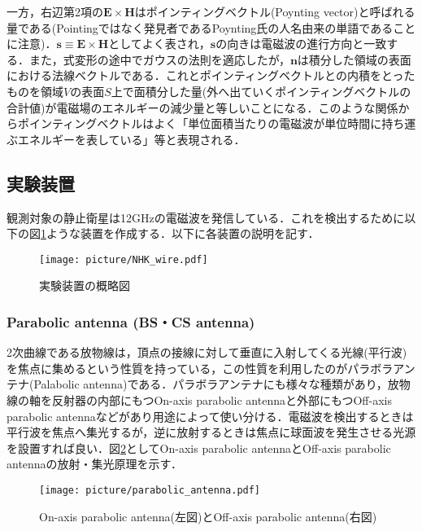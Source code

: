 \documentclass[a4j,10pt,oneside,openany]{jsbook}
\newcommand{\vE}{\boldsymbol{E}}
\newcommand{\vH}{\boldsymbol{H}}
\newcommand{\vn}{\boldsymbol{n}}
\newcommand{\vs}{\boldsymbol{s}}
\begin{document}
{一方，右辺第2項の$\vE\times\vH$はポインティングベクトル(Poynting vector)と呼ばれる量である(Pointingではなく発見者であるPoynting氏の人名由来の単語であることに注意)．$\vs\equiv\vE\times\vH$としてよく表され，$\vs$の向きは電磁波の進行方向と一致する．また，式変形の途中でガウスの法則を適応したが，$\vn$は積分した領域の表面における法線ベクトルである．これとポインティングベクトルとの内積をとったものを領域$V$の表面$S$上で面積分した量(外へ出ていくポインティングベクトルの合計値)が電磁場のエネルギーの減少量と等しいことになる．このような関係からポインティングベクトルはよく「単位面積当たりの電磁波が単位時間に持ち運ぶエネルギーを表している」等と表現される．



\subsection{実験装置}
観測対象の静止衛星は12GHzの電磁波を発信している．これを検出するために以下の図\ref{fig:NHK_wire}ような装置を作成する．以下に各装置の説明を記す．
\begin{figure}[htbp]
  \begin{center}
    \texttt{[image: picture/NHK\_wire.pdf]}
    \caption{実験装置の概略図}
    \label{fig:NHK_wire}
  \end{center}
\end{figure}

\subsubsection{Parabolic antenna (BS・CS antenna)}
2次曲線である放物線は，頂点の接線に対して垂直に入射してくる光線(平行波)を焦点に集めるという性質を持っている，この性質を利用したのがパラボラアンテナ(Palabolic antenna)である．パラボラアンテナにも様々な種類があり，放物線の軸を反射器の内部にもつOn-axis parabolic antennaと外部にもつOff-axis parabolic antennaなどがあり用途によって使い分ける．電磁波を検出するときは平行波を焦点へ集光するが，逆に放射するときは焦点に球面波を発生させる光源を設置すれば良い．図\ref{fig:parabolic}としてOn-axis parabolic antennaとOff-axis parabolic antennaの放射・集光原理を示す．
\begin{figure}[htbp]
  \begin{center}
    \texttt{[image: picture/parabolic\_antenna.pdf]}
    \caption{On-axis parabolic antenna(左図)とOff-axis parabolic antenna(右図)\cite{pic1}}
    \label{fig:parabolic}
  \end{center}
\end{figure}

}
\end{document}
